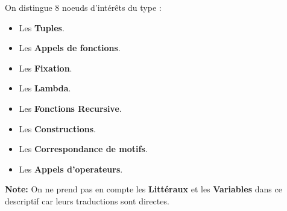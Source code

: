 \documentclass[12pt]{article}
\begin{document}
On distingue 8 noeuds d'intérêts du type :
\begin{itemize}
      \tightlist
      \item
            Les \textbf{Tuples}.
      \item
            Les \textbf{Appels de fonctions}.
      \item
            Les \textbf{Fixation}.
      \item
            Les \textbf{Lambda}.
      \item
            Les \textbf{Fonctions Recursive}.
      \item
            Les \textbf{Constructions}.
      \item
            Les \textbf{Correspondance de motifs}.
      \item
            Les \textbf{Appels d'operateurs}.
\end{itemize}
\textbf{Note:} On ne prend pas en compte les \textbf{Littéraux} et les \textbf{Variables} dans ce descriptif car leurs traductions sont directes.
\end{document}
